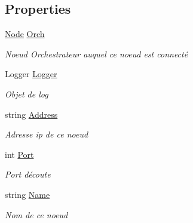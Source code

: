 \subsection*{Properties}
\begin{DoxyCompactItemize}
\item 
\hyperlink{class_node_net_1_1_network_1_1_nodes_1_1_node}{Node} \hyperlink{class_node_net_1_1_network_1_1_nodes_1_1_node_ad9b9f16efa608d2507dd69c8e1c71f8e}{Orch}
\begin{DoxyCompactList}\small\item\em Noeud Orchestrateur auquel ce noeud est connecté \end{DoxyCompactList}\item 
Logger \hyperlink{class_node_net_1_1_network_1_1_nodes_1_1_node_ae6b6909cb4188712c35457ba7e32567a}{Logger}
\begin{DoxyCompactList}\small\item\em Objet de log \end{DoxyCompactList}\item 
string \hyperlink{class_node_net_1_1_network_1_1_nodes_1_1_node_a5930d056ff2b900b3189ce91c156fbf3}{Address}
\begin{DoxyCompactList}\small\item\em Adresse ip de ce noeud \end{DoxyCompactList}\item 
int \hyperlink{class_node_net_1_1_network_1_1_nodes_1_1_node_af7cf2568cb0d31b5ce7fb94d79a01e0d}{Port}
\begin{DoxyCompactList}\small\item\em Port d\textquotesingle{}écoute \end{DoxyCompactList}\item 
string \hyperlink{class_node_net_1_1_network_1_1_nodes_1_1_node_a6e4f23cf8706563042d0683add4c7cea}{Name}
\begin{DoxyCompactList}\small\item\em Nom de ce noeud \end{DoxyCompactList}\item 

\end{DoxyCompactItemize}
